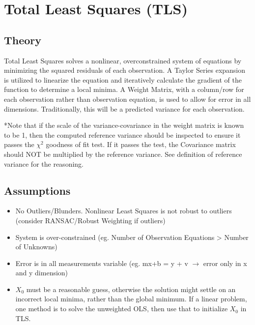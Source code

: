 \section{Total Least Squares (TLS)}
\subsection{Theory}
Total Least Squares solves a nonlinear, overconstrained system of equations by minimizing the squared residuals of each observation.  A Taylor Series expansion is utilized to linearize the equation and iteratively calculate the gradient of the function to determine a local minima.  A Weight Matrix, with a column/row for each observation rather than observation equation, is used to allow for error in all dimensions.  Traditionally, this will be a predicted variance for each observation.

*Note that if the scale of the variance-covariance in the weight matrix is known to be 1, then the computed reference variance should be inspected to ensure it passes the $\chi^2$ goodness of fit test.  If it passes the test, the Covariance matrix should NOT be multiplied by the reference variance.  See definition of reference variance for the reasoning.

\subsection{Assumptions}
\begin{itemize}
	\item No Outliers/Blunders. Nonlinear Least Squares is not robust to outliers (consider RANSAC/Robust Weighting if outliers)
	\item System is over-constrained (eg. Number of Observation Equations > Number of Unknowns)
	\item Error is in all measurements variable (eg. mx+b = y + v $\rightarrow$ error only in x and y dimension)
	\item $X_0$ must be a reasonable guess, otherwise the solution might settle on an incorrect local minima, rather than the global minimum.  If a linear problem, one method is to solve the unweighted OLS, then use that to initialize $X_0$ in TLS.
\end{itemize}
